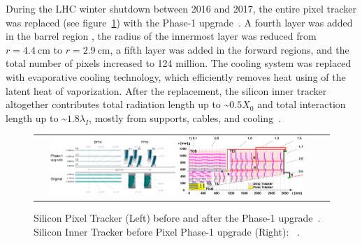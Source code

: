 During the LHC winter shutdown between 2016 and 2017, the entire pixel tracker was replaced (see figure~\ref{Inner_Tracker}) with the Phase-1 upgrade~\cite{Lipinski_2017}.
A fourth layer was added in the barrel region , the radius of the innermost layer was reduced from $r = \SI{4.4}{\cm}$ to $r = \SI{2.9}{\cm}$, a fifth layer was added in the forward regions, and the total number of pixels increased to 124 million.
The cooling system was replaced with evaporative  cooling technology, which efficiently removes heat using of the latent heat of vaporization.
After the replacement, the silicon inner tracker altogether contributes total radiation length up to \sim$0.5 X_0$ and total interaction length up to \sim$1.8 \lambda_I$, mostly from supports, cables, and cooling~\cite{Sirunyan:2270046}.
\begin{figure}[!htb]
  \begin{center}
    \begin{tabular}{cc}
        \includegraphics[width=0.45\textwidth]{fig_LHC_CMS/Pixel_Upgrade.png}
        \includegraphics[width=0.45\textwidth]{fig_LHC_CMS/Inner_Tracker.png}
    \end{tabular}
    \caption{Silicon Pixel Tracker (Left) before and after the Phase-1 upgrade~\cite{Adam_2021}.
             Silicon Inner Tracker before Pixel Phase-1 upgrade (Right): ~\cite{Chatrchyan:1211825}.
            }
    \label{Inner_Tracker}
  \end{center}
\end{figure}

